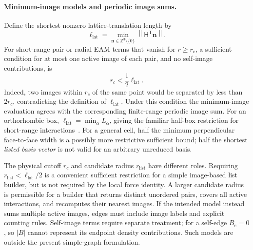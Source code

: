 \documentclass[11pt,a4paper]{article}
\newcommand{\ZZ}{\mathbb Z}
\newcommand{\norm}[1]{\left\lVert #1\right\rVert}
\newcommand{\vect}[1]{\bm{#1}}
\newcommand{\cell}{\mathsf H}
\theoremstyle{definition}
\begin{document}
\paragraph{Minimum-image models and periodic image sums.}
Define the shortest nonzero lattice-translation length by
\begin{equation}
\ell_{\mathrm{lat}}=\min_{\vect n\in\ZZ^3\setminus\{0\}}
\norm{\cell^{\mathsf T}\vect n}.
\label{eq:lattice-length}
\end{equation}
For short-range pair or radial EAM terms that vanish for $r\ge r_c$, a sufficient condition
for at most one active image of each pair, and no self-image contributions, is
\begin{equation}
r_c<\frac12\ell_{\mathrm{lat}}.
\label{eq:unique-image-cutoff}
\end{equation}
Indeed, two images within $r_c$ of the same point would be separated by less than $2r_c$,
contradicting the definition of $\ell_{\mathrm{lat}}$. Under this condition the minimum-image
evaluation agrees with the corresponding finite-range periodic image sum. For an orthorhombic
box, $\ell_{\mathrm{lat}}=\min_\alpha L_\alpha$, giving the familiar half-box restriction
for short-range interactions~\cite{gromacs-pbc}. For a general cell, half the minimum
perpendicular face-to-face width is a possibly more restrictive sufficient bound; half the
shortest \emph{listed basis vector} is not valid for an arbitrary unreduced basis.

The physical cutoff $r_c$ and candidate radius $r_{\mathrm{list}}$ have different roles.
Requiring $r_{\mathrm{list}}<\ell_{\mathrm{lat}}/2$ is a convenient sufficient restriction
for a simple image-based list builder, but is not required by the local force identity.
A larger candidate radius is permissible for a builder that returns distinct unordered pairs,
covers all active interactions, and recomputes their nearest images. If the intended model
instead sums multiple active images, edges must include image labels and explicit counting
rules. Self-image terms require separate treatment; for a self-edge $B_e=0$, so $|B|$ cannot
represent its endpoint density contributions. Such models are outside the present simple-graph
formulation.
\end{document}
